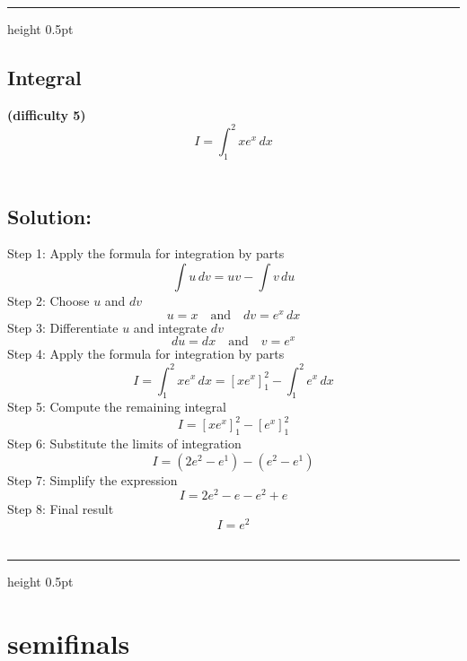 \documentclass{article}
\renewcommand{\rule}[2]{\leavevmode\leaders\hrule height #2 \hfill \kern 0pt}
\begin{document}
\begin{itemize}
  \begin{center}\rule{0.5\linewidth}{0.5pt}\end{center}

  \subsection{Integral}\label{integral-2}

  \textbf{(difficulty 5)}\\
  \[
  I = \int_1^2 x e^x \, dx
  \]\\

  \subsection{Solution:}\label{solution-2}

  \hfill\break
  Step 1: Apply the formula for integration by parts \[
  \int u \, dv = uv - \int v \, du
  \] Step 2: Choose \(u\) and \(dv\) \[
  u = x \quad \text{and} \quad dv = e^x \, dx
  \] Step 3: Differentiate \(u\) and integrate \(dv\) \[
  du = dx \quad \text{and} \quad v = e^x
  \] Step 4: Apply the formula for integration by parts \[
  I = \int_1^2 x e^x \, dx = \left[ x e^x \right]_1^2 - \int_1^2 e^x \, dx
  \] Step 5: Compute the remaining integral \[
  I = \left[ x e^x \right]_1^2 - \left[ e^x \right]_1^2
  \] Step 6: Substitute the limits of integration \[
  I = \left( 2e^2 - e^1 \right) - \left( e^2 - e^1 \right)
  \] Step 7: Simplify the expression \[
  I = 2e^2 - e - e^2 + e
  \] Step 8: Final result \[
  I = e^2
  \]\\

  \begin{center}\rule{0.5\linewidth}{0.5pt}\end{center}
\end{itemize}

\section{semifinals}\label{semifinals}
\end{document}
